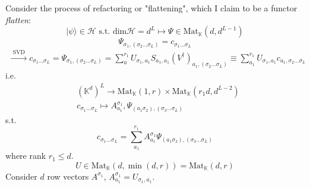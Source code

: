 Consider the process of refactoring or "flattening", which I claim to be a functor \emph{flatten}: 
\[
| \psi \rangle \in \mathcal{H} \text{ s.t. } \text{dim}\mathcal{H} = d^L \mapsto \Psi \in \text{Mat}_{\mathbb{K}}(d,d^{L-1})
\]
\[
\Psi_{\sigma_1, (\sigma_2 \dots \sigma_L) } = c_{\sigma_1 \dots \sigma_L}
\]
\begin{equation}
\begin{gathered}
\xrightarrow{ \text{ SVD } } c_{\sigma_1 \dots \sigma_L} = \Psi_{\sigma_1, (\sigma_2 \dots \sigma_L)} = \sum_a^{r_1} U_{\sigma_1, a_1} S_{a_1,a_1} (V^{\dag})_{a_1, (\sigma_2 \dots \sigma_L)} \equiv \sum_{a_1}^{r_1} U_{\sigma_1 , a_1} c_{a_1 , \sigma_2 \dots \sigma_L}
\end{gathered}
\end{equation}
i.e.
\[
\begin{aligned}
	& (\mathbb{K}^d)^L \to \text{Mat}_{\mathbb{K}}(1,r) \times \text{Mat}_{\mathbb{K}}(r_1 d, d^{L-2}) \\ 
	& c_{\sigma_1 \dots \sigma_L} \mapsto A_{a_1}^{\sigma_1} , \Psi_{(a_1\sigma_2), (\sigma_3\dots \sigma_L)} 
\end{aligned}
\]
s.t. 
\[
c_{\sigma_1\dots \sigma_L} = \sum_{a_1}^{r_1} A_{a_1}^{\sigma_1} \Psi_{(a_1\sigma_2), (\sigma_3 \dots \sigma_L)}
\]
where rank $r_1 \leq d$.  
\[
U \in \text{Mat}_{\mathbb{K}}(d,\min{(d,r)}) = \text{Mat}_{\mathbb{K}}(d,r)
\]
Consider $d$ row vectors $A^{\sigma_1}$, $A^{\sigma_1}_{a_1} = U_{\sigma_1,a_1}$.  

